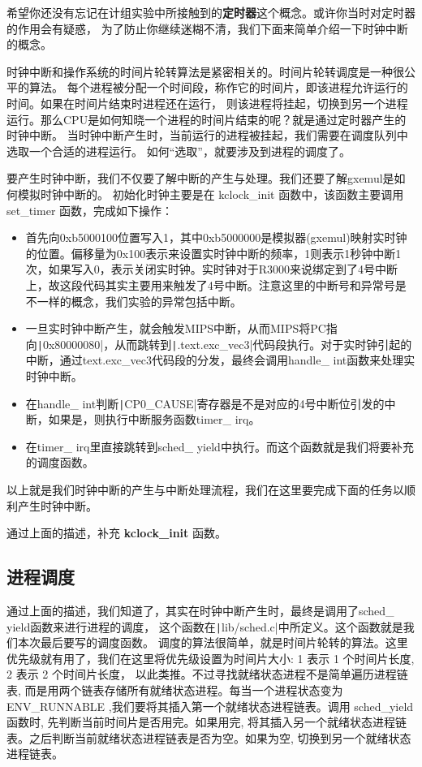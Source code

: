 希望你还没有忘记在计组实验中所接触到的\textbf{定时器}这个概念。或许你当时对定时器的作用会有疑惑，
为了防止你继续迷糊不清，我们下面来简单介绍一下时钟中断的概念。

时钟中断和操作系统的时间片轮转算法是紧密相关的。时间片轮转调度是一种很公平的算法。
每个进程被分配一个时间段，称作它的时间片，即该进程允许运行的时间。如果在时间片结束时进程还在运行，
则该进程将挂起，切换到另一个进程运行。那么CPU是如何知晓一个进程的时间片结束的呢？就是通过定时器产生的时钟中断。
当时钟中断产生时，当前运行的进程被挂起，我们需要在调度队列中选取一个合适的进程运行。
如何“选取”，就要涉及到进程的调度了。

要产生时钟中断，我们不仅要了解中断的产生与处理。我们还要了解gxemul是如何模拟时钟中断的。
初始化时钟主要是在 kclock\_init 函数中，该函数主要调用set\_timer 函数，完成如下操作：
\begin{itemize}
  \item 首先向0xb5000100位置写入1，其中0xb5000000是模拟器(gxemul)映射实时钟的位置。偏移量为0x100表示来设置实时钟中断的频率，1则表示1秒钟中断1次，如果写入0，表示关闭实时钟。实时钟对于R3000来说绑定到了4号中断上，故这段代码其实主要用来触发了4号中断。注意这里的中断号和异常号是不一样的概念，我们实验的异常包括中断。
  \item 一旦实时钟中断产生，就会触发MIPS中断，从而MIPS将PC指向\texttt|0x80000080|，从而跳转到\texttt|.text.exc_vec3|代码段执行。对于实时钟引起的中断，通过text.exc\_vec3代码段的分发，最终会调用handle\_ int函数来处理实时钟中断。
  \item 在handle\_ int判断\texttt|CP0_CAUSE|寄存器是不是对应的4号中断位引发的中断，如果是，则执行中断服务函数timer\_ irq。
  \item 在timer\_ irq里直接跳转到sched\_ yield中执行。而这个函数就是我们将要补充的调度函数。
\end{itemize}

以上就是我们时钟中断的产生与中断处理流程，我们在这里要完成下面的任务以顺利产生时钟中断。

\begin{exercise}
通过上面的描述，补充 \textbf{ kclock\_init } 函数。
\end{exercise}

\subsection{进程调度}

通过上面的描述，我们知道了，其实在时钟中断产生时，最终是调用了sched\_ yield函数来进行进程的调度，
这个函数在\texttt|lib/sched.c|中所定义。这个函数就是我们本次最后要写的调度函数。
调度的算法很简单，就是时间片轮转的算法。这里优先级就有用了，我们在这里将优先级设置为时间片大小: 1 表示 1 个时间片长度,  2 表示 2 个时间片长度，
以此类推。不过寻找就绪状态进程不是简单遍历进程链表, 而是用两个链表存储所有就绪状态进程。每当一个进程状态变为 ENV\_RUNNABLE ,我们要将其插入第一个就绪状态进程链表。调用 sched\_yield 函数时, 先判断当前时间片是否用完。如果用完, 将其插入另一个就绪状态进程链表。之后判断当前就绪状态进程链表是否为空。如果为空, 切换到另一个就绪状态进程链表。

